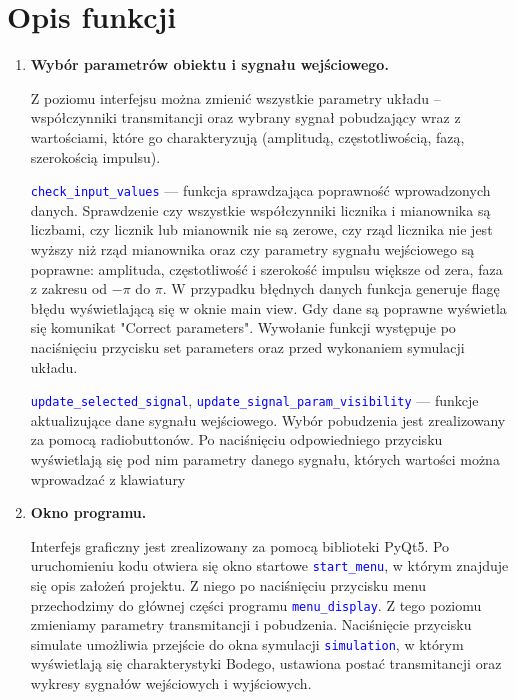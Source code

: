 \documentclass[10pt, a4paper]{article}
\begin{document}

\section{Opis funkcji}

\begin{enumerate}[label=\alph*.]
  \item \textbf{Wybór parametrów obiektu i sygnału wejściowego.} \par\vspace{0.1cm}
  Z poziomu interfejsu można zmienić wszystkie parametry układu – współczynniki transmitancji oraz wybrany sygnał pobudzający wraz z wartościami, które go charakteryzują 
  (amplitudą, częstotliwością, fazą, szerokością impulsu). 

  \vspace{0.1cm}

  \textcolor{blue}{\texttt{check\_input\_values}} --- funkcja sprawdzająca poprawność wprowadzonych danych. Sprawdzenie czy wszystkie współczynniki licznika i mianownika
  są liczbami, czy licznik lub mianownik nie są zerowe, czy rząd licznika nie jest wyższy niż rząd mianownika oraz czy parametry sygnału wejściowego są poprawne: amplituda, 
  częstotliwość i szerokość impulsu większe od zera, faza z zakresu od $-\pi$ do $\pi$. W przypadku błędnych danych funkcja generuje flagę błędu wyświetlającą się w 
  oknie main view. Gdy dane są poprawne wyświetla się komunikat "Correct parameters". Wywołanie funkcji występuje po naciśnięciu przycisku set parameters oraz przed wykonaniem
  symulacji układu.

  \vspace{0.1cm}

  \textcolor{blue}{\texttt{update\_selected\_signal}}, \textcolor{blue}{\texttt{update\_signal\_param\_visibility}} --- funkcje aktualizujące dane sygnału wejściowego. 
  Wybór pobudzenia jest zrealizowany za pomocą radiobuttonów. Po naciśnięciu odpowiedniego przycisku wyświetlają się pod nim parametry danego sygnału, których wartości
  można wprowadzać z klawiatury

  \vspace{0.2cm}
  
  \item \textbf{Okno programu.} \par\vspace{0.1cm}
  Interfejs graficzny jest zrealizowany za pomocą biblioteki PyQt5. Po uruchomieniu kodu otwiera się okno startowe \textcolor{blue}{\texttt{start\_menu}}, w którym
  znajduje się opis założeń projektu. Z niego po naciśnięciu przycisku menu przechodzimy do głównej części programu \textcolor{blue}{\texttt{menu\_display}}. 
  Z tego poziomu zmieniamy parametry transmitancji i pobudzenia. Naciśnięcie przycisku simulate umożliwia przejście do okna symulacji \textcolor{blue}{\texttt{simulation}}, 
  w którym wyświetlają się charakterystyki Bodego, ustawiona postać transmitancji oraz wykresy sygnałów wejściowych i wyjściowych.


\end{enumerate}
\end{document}
